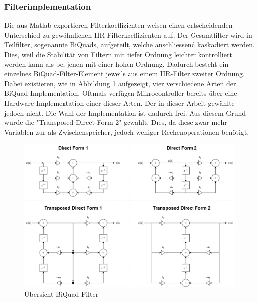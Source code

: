 \documentclass[12pt]{article}
\begin{document}
	\subsubsection*{Filterimplementation}
	Die aus Matlab exportieren Filterkoeffizienten weisen einen entscheidenden Unterschied zu gewöhnlichen IIR-Filterkoeffizienten auf. Der Gesamtfilter wird in Teilfilter, sogenannte BiQuads, aufgeteilt, welche anschliessend kaskad\-iert werden. Dies, weil die Stabilität von Filtern mit tiefer Ordnung leichter kontrolliert werden kann als bei jenen mit einer hohen Ordnung. Dadurch besteht ein einzelnes BiQuad-Filter-Element jeweils aus einem IIR-Filter zweiter Ordnung. Dabei existieren, wie in Abbildung \ref{fig:batbiquad-uebersicht} aufgezeigt, vier verschiedene Arten der BiQuad-Implementation. Oftmals verfügen Mikrocontroller bereits über eine Hardware-Implementation einer dieser Arten. Der in dieser Arbeit gewählte jedoch nicht. Die Wahl der Implementation ist dadurch frei. Aus diesem Grund wurde die "Transposed Direct Form 2" gewählt. Dies, da diese zwar mehr Variablen zur als Zwischenspeicher, jedoch weniger Rechenoperationen benötigt.
	\begin{figure}[H]
		\centering
		\includegraphics[width=1\linewidth]{images/BAT_BiQuad-Uebersicht}
		\caption{Übersicht BiQuad-Filter}
		\label{fig:batbiquad-uebersicht}
	\end{figure}
\end{document}
